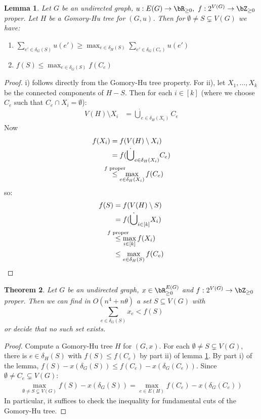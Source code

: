 \documentclass[11pt, a4paper]{article}
\newcommand{\stackalign}[2]{\stackrel{\mathclap{#1}}{#2}}
\newtheorem{theorem}{Theorem}[section]
\newtheorem{lemma}[theorem]{Lemma}
\theoremstyle{remark}
\theoremstyle{definition}
\begin{document}
\begin{lemma}\label{lemma:proper-func-gomory-hu}
	Let $G$ be an undirected graph, $u: E(G)\to\bR_{\geq0},\ f: 2^{V(G)}\to
		\bZ_{\geq0}$ proper. Let $H$ be a Gomory-Hu tree for $(G,u)$. Then for
	$\emptyset\neq S\subsetneq V(G)$ we have:
	\begin{enumerate}[label=\roman*)]
		\item $\sum_{e'\in \delta_G(S)}u(e')\geq \max_{e\in\delta_H(S)}
			\sum_{e'\in\delta_G(C_e)}u(e')$

		\item $f(S)\leq \max_{e\in\delta_G(S)}f(C_e)$
	\end{enumerate}
\end{lemma}
\begin{proof}
	i) follows directly from the Gomory-Hu tree property. For ii), let
	$X_1,\ldots,X_k$ be the connected components of $H-S$. Then for each
	$i\in[k]$ (where we choose $C_e$ such that $C_e\cap X_i=\emptyset$):
	\begin{align*}
		V(H)\setminus X_i & =\dot\bigcup_{e\in\delta_H(X_i)}C_e
	\end{align*}
	Now
	\begin{align*}
		f(X_i) & =f(V(H)\setminus X_i)                                             \\
		       & =f(\dot\bigcup_{e\in\delta_H(X_i)}C_e)                            \\
		       & \stackalign{f\text{ proper}}{\leq} \max_{e\in\delta_H(X_i)}f(C_e)
	\end{align*}
	so:
	\begin{align*}
		f(S) & =f(V(H)\setminus S)                                     \\
		     & =f(\dot\bigcup_{i\in [k]}X_i)                           \\
		     & \stackalign{f\text{ proper}}{\leq}\max_{i\in [k]}f(X_i) \\
		     & \leq \max_{e\in\delta_H(S)}f(C_e)
	\end{align*}
\end{proof}

\begin{theorem}\label{thm:proper-func-separation}
	Let $G$ be an undirected graph, $x\in\bR^{E(G)}_{\geq0}$ and $f: 2^{V(G)}
		\to\bZ_{\geq0}$ proper. Then we can find in $O(n^4+n\theta)$ a set
	$S\subseteq V(G)$ with
	\[\sum_{e\in\delta_G(S)}x_e<f(S)\]
	or decide that no such set exists.
\end{theorem}
\begin{proof}
	Compute a Gomory-Hu tree $H$ for $(G,x)$. For each $\emptyset\neq S
		\subsetneq V(G)$, there is $e\in\delta_H(S)$ with $f(S)\leq f(C_e)$ by
	part ii) of lemma \ref{lemma:proper-func-gomory-hu}. By part i) of the
	lemma, $f(S)-x(\delta_G(S))\leq f(C_e)-x(\delta_G(C_e))$. Since $\emptyset
		\neq C_e \subsetneq V(G)$:
	\begin{align*}
		\max_{\emptyset\neq S\subsetneq V(G)}f(S)-x(\delta_G(S))
		=\max_{e\in E(H)}f(C_e)-x(\delta_G(C_e))
	\end{align*}
	In particular, it suffices to check the inequality for fundamental
	cuts of the Gomory-Hu tree.
\end{proof}
\end{document}
